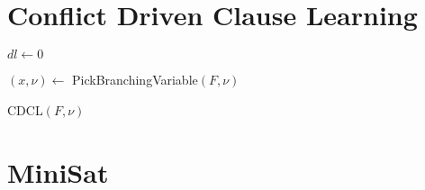 \section{Conflict Driven Clause Learning}
\label{sec:cdcl}

\begin{algorithm}[!ht]
\label{alg:cdcl}
    \Input{}
    \Output{}

    {}

    $dl \leftarrow 0$

    {$(x, \nu) \leftarrow$ PickBranchingVariable$(F,\nu)$}

    
    \caption{CDCL$(F, \nu)$}
\end{algorithm}

\section{MiniSat}
\label{sec:minisat}

